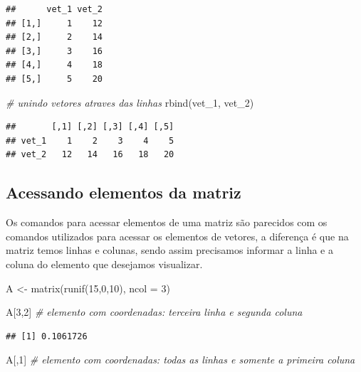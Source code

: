 \documentclass[
]{book}
\newenvironment{Shaded}{\begin{snugshade}}{\end{snugshade}}
\newcommand{\AttributeTok}[1]{\textcolor[rgb]{0.77,0.63,0.00}{#1}}
\newcommand{\CommentTok}[1]{\textcolor[rgb]{0.56,0.35,0.01}{\textit{#1}}}
\newcommand{\DecValTok}[1]{\textcolor[rgb]{0.00,0.00,0.81}{#1}}
\newcommand{\FunctionTok}[1]{\textcolor[rgb]{0.00,0.00,0.00}{#1}}
\newcommand{\NormalTok}[1]{#1}
\newcommand{\OtherTok}[1]{\textcolor[rgb]{0.56,0.35,0.01}{#1}}
\begin{document}
\begin{verbatim}
##      vet_1 vet_2
## [1,]     1    12
## [2,]     2    14
## [3,]     3    16
## [4,]     4    18
## [5,]     5    20
\end{verbatim}

\begin{Shaded}
\begin{Highlighting}[]
\CommentTok{\# unindo vetores atraves das linhas}
\FunctionTok{rbind}\NormalTok{(vet\_1, vet\_2)}
\end{Highlighting}
\end{Shaded}

\begin{verbatim}
##       [,1] [,2] [,3] [,4] [,5]
## vet_1    1    2    3    4    5
## vet_2   12   14   16   18   20
\end{verbatim}

\hypertarget{acessando-elementos-da-matriz}{%
\subsection{Acessando elementos da matriz}\label{acessando-elementos-da-matriz}}

Os comandos para acessar elementos de uma matriz são parecidos com os comandos utilizados para acessar os elementos de vetores, a diferença é que na matriz temos linhas e colunas, sendo assim precisamos informar a linha e a coluna do elemento que desejamos visualizar.

\begin{Shaded}
\begin{Highlighting}[]
\NormalTok{A }\OtherTok{\textless{}{-}} \FunctionTok{matrix}\NormalTok{(}\FunctionTok{runif}\NormalTok{(}\DecValTok{15}\NormalTok{,}\DecValTok{0}\NormalTok{,}\DecValTok{10}\NormalTok{), }\AttributeTok{ncol =} \DecValTok{3}\NormalTok{)}

\NormalTok{A[}\DecValTok{3}\NormalTok{,}\DecValTok{2}\NormalTok{] }\CommentTok{\# elemento com coordenadas: terceira linha  e segunda coluna}
\end{Highlighting}
\end{Shaded}

\begin{verbatim}
## [1] 0.1061726
\end{verbatim}

\begin{Shaded}
\begin{Highlighting}[]
\NormalTok{A[,}\DecValTok{1}\NormalTok{] }\CommentTok{\# elemento com coordenadas: todas as linhas e somente a primeira coluna}
\end{Highlighting}
\end{Shaded}
\end{document}
